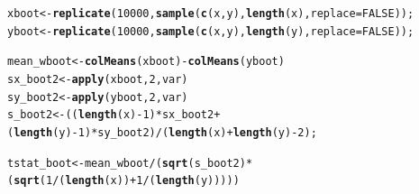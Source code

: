 \documentclass{beamer}\usepackage[]{graphicx}\usepackage[]{color}
\makeatletter
\newcommand{\hlnum}[1]{\textcolor[rgb]{0.2,0.2,0.2}{#1}}%
\newcommand{\hlopt}[1]{\textcolor[rgb]{0.102,0.102,0.102}{#1}}%
\newcommand{\hlstd}[1]{\textcolor[rgb]{0.102,0.102,0.102}{#1}}%
\newcommand{\hlkwb}[1]{\textcolor[rgb]{0.102,0.102,0.102}{#1}}%
\newcommand{\hlkwc}[1]{\textcolor[rgb]{0.2,0.2,0.2}{#1}}%
\newcommand{\hlkwd}[1]{\textcolor[rgb]{0.102,0.102,0.102}{\textbf{#1}}}%
\newenvironment{kframe}{%
 \def\at@end@of@kframe{}%
 \ifinner\ifhmode%
  \def\at@end@of@kframe{\end{minipage}}%
  \begin{minipage}{\columnwidth}%
 \fi\fi%
 \def\FrameCommand##1{\hskip\@totalleftmargin \hskip-\fboxsep
 \colorbox{shadecolor}{##1}\hskip-\fboxsep
     \hskip-\linewidth \hskip-\@totalleftmargin \hskip\columnwidth}%
 \MakeFramed {\advance\hsize-\width
   \@totalleftmargin\z@ \linewidth\hsize
   \@setminipage}}%
 {\par\unskip\endMakeFramed%
 \at@end@of@kframe}
\newenvironment{knitrout}{}{} %
\renewenvironment{knitrout}{\begin{spacing}{0.75}\begin{tiny}}{\end{tiny}\end{spacing}}
\makeatother
\begin{document}
\begin{frame}[fragile]

\begin{knitrout}\small
{}\color{fgcolor}\begin{kframe}
\begin{alltt}
\hlstd{xboot} \hlkwb{<-} \hlkwd{replicate}\hlstd{(}\hlnum{10000}\hlstd{,} \hlkwd{sample}\hlstd{(}\hlkwd{c}\hlstd{(x,y),} \hlkwd{length}\hlstd{(x),} \hlkwc{replace} \hlstd{=} \hlnum{FALSE}\hlstd{));}
\hlstd{yboot} \hlkwb{<-} \hlkwd{replicate}\hlstd{(}\hlnum{10000}\hlstd{,} \hlkwd{sample}\hlstd{(}\hlkwd{c}\hlstd{(x,y),} \hlkwd{length}\hlstd{(y),} \hlkwc{replace} \hlstd{=} \hlnum{FALSE}\hlstd{));}

\hlstd{mean_wboot} \hlkwb{<-} \hlkwd{colMeans}\hlstd{(xboot)}  \hlopt{-} \hlkwd{colMeans}\hlstd{(yboot)}
\hlstd{sx_boot2} \hlkwb{<-} \hlkwd{apply}\hlstd{(xboot,} \hlnum{2}\hlstd{, var)}
\hlstd{sy_boot2} \hlkwb{<-} \hlkwd{apply}\hlstd{(yboot,} \hlnum{2}\hlstd{, var)}
\hlstd{s_boot2} \hlkwb{<-} \hlstd{((}\hlkwd{length}\hlstd{(x)}\hlopt{-}\hlnum{1}\hlstd{)}\hlopt{*}\hlstd{sx_boot2} \hlopt{+} \hlstd{(}\hlkwd{length}\hlstd{(y)}\hlopt{-}\hlnum{1}\hlstd{)}\hlopt{*}\hlstd{sy_boot2)}\hlopt{/}\hlstd{(}\hlkwd{length}\hlstd{(x)}\hlopt{+}\hlkwd{length}\hlstd{(y)}\hlopt{-}\hlnum{2}\hlstd{);}

\hlstd{tstat_boot} \hlkwb{<-} \hlstd{mean_wboot}\hlopt{/}\hlstd{(}\hlkwd{sqrt}\hlstd{(s_boot2)}\hlopt{*}\hlstd{(}\hlkwd{sqrt}\hlstd{(}\hlnum{1}\hlopt{/}\hlstd{(}\hlkwd{length}\hlstd{(x))} \hlopt{+} \hlnum{1}\hlopt{/}\hlstd{(}\hlkwd{length}\hlstd{(y)))))}
\end{alltt}
\end{kframe}
\end{knitrout}

\end{frame}
\end{document}
